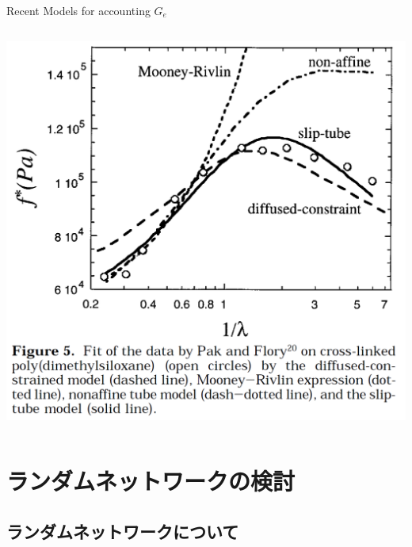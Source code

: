 \documentclass[aspectratio=169,11pt, dvipdfmx]{beamer}
\begin{document}
\begin{frame}
\begin{exampleblock}{Recent Models for accounting $G_e$}
\begin{columns}[totalwidth=1\textwidth]
				\includegraphics[width=\textwidth]{NW_model_rubinstein.png}
			\end{columns}
        \end{exampleblock}
\end{frame}

\setcounter{footnote}{0}
\section{ランダムネットワークの検討}
\subsection{ランダムネットワークについて}
\end{document}
